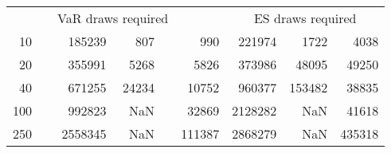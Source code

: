 {{\begin{longtable}{rr rrr r rrr}
\hline 
 && \multicolumn{3}{c}{VaR draws required} &&   \multicolumn{3}{c}{ES draws required} \\  \cline{3-5}  \cline{7-9} 
10 & & 185239 & 807 & & 990 & 221974 & 1722 & 4038 \\ 
20 & & 355991 & 5268 & & 5826 & 373986 & 48095 & 49250 \\ 
40 & & 671255 & 24234 & & 10752 & 960377 & 153482 & 38835 \\ 
100 & & 992823 & NaN & & 32869 & 2128282 & NaN & 41618 \\ 
250 & & 2558345 & NaN & & 111387 & 2868279 & NaN & 435318 \\ 
\hline 
\end{longtable} 
} 
} 
